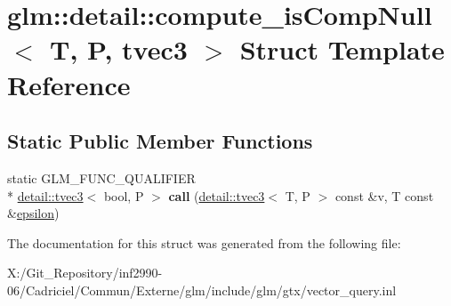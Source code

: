 \hypertarget{structglm_1_1detail_1_1compute__is_comp_null_3_01_t_00_01_p_00_01tvec3_01_4}{\section{glm\-:\-:detail\-:\-:compute\-\_\-is\-Comp\-Null$<$ T, P, tvec3 $>$ Struct Template Reference}
\label{structglm_1_1detail_1_1compute__is_comp_null_3_01_t_00_01_p_00_01tvec3_01_4}
}
\subsection*{Static Public Member Functions}
\begin{DoxyCompactItemize}
\item 
\hypertarget{structglm_1_1detail_1_1compute__is_comp_null_3_01_t_00_01_p_00_01tvec3_01_4_a0a45c3ab9debff20dae1f53392500840}{static G\-L\-M\-\_\-\-F\-U\-N\-C\-\_\-\-Q\-U\-A\-L\-I\-F\-I\-E\-R \\*
\hyperlink{structglm_1_1detail_1_1tvec3}{detail\-::tvec3}$<$ bool, P $>$ {\bfseries call} (\hyperlink{structglm_1_1detail_1_1tvec3}{detail\-::tvec3}$<$ T, P $>$ const \&v, T const \&\hyperlink{group__gtc__constants_gacb41049b8d22c8aa90e362b96c524feb}{epsilon})}\label{structglm_1_1detail_1_1compute__is_comp_null_3_01_t_00_01_p_00_01tvec3_01_4_a0a45c3ab9debff20dae1f53392500840}

\end{DoxyCompactItemize}


The documentation for this struct was generated from the following file\-:\begin{DoxyCompactItemize}
\item 
X\-:/\-Git\-\_\-\-Repository/inf2990-\/06/\-Cadriciel/\-Commun/\-Externe/glm/include/glm/gtx/vector\-\_\-query.\-inl\end{DoxyCompactItemize}
